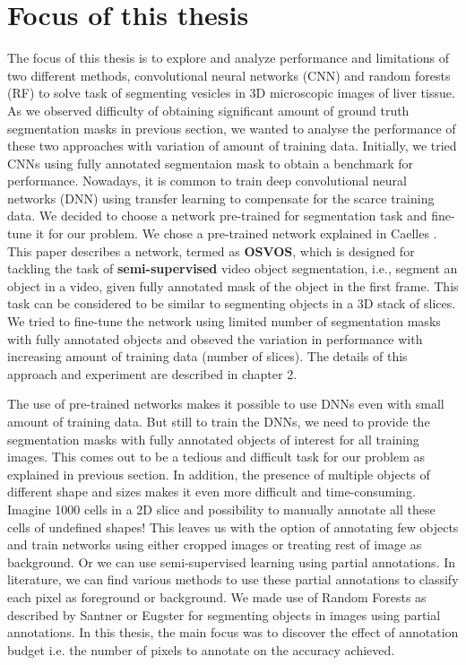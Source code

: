 \section{Focus of this thesis}
The focus of this thesis is to explore and analyze performance and limitations of two different methods, convolutional neural networks (CNN) and random forests (RF) to solve task of segmenting vesicles in 3D microscopic images of liver tissue. As we observed difficulty of obtaining significant amount of ground truth segmentation masks in previous section, we wanted to analyse the performance of these two approaches with variation of amount of training data. Initially, we tried CNNs using fully annotated segmentaion mask to obtain a benchmark for performance. Nowadays, it is common to train deep convolutional neural networks (DNN) using transfer learning to compensate for the scarce training data. We decided to choose a network pre-trained for segmentation task and fine-tune it for our problem. We chose a pre-trained network explained in Caelles \cite{osvos}. This paper describes a network, termed as \textbf{OSVOS}, which is designed for tackling the task of \textbf{semi-supervised} video object segmentation, i.e., segment an object in a video, given fully annotated mask of the object in the first frame. This task can be considered to be similar to segmenting objects in a 3D stack of slices. We tried to fine-tune the network using limited number of segmentation masks with fully annotated objects and obseved the variation in performance with increasing amount of training data (number of slices). The details of this approach and experiment are described in chapter 2.  \par
The use of pre-trained networks makes it possible to use DNNs even with small amount of training data. But still to train the DNNs, we need to provide the segmentation masks with fully annotated objects of interest for all training images. This comes out to be a tedious and difficult task for our problem as explained in previous section. In addition, the presence of multiple objects of different shape and sizes makes it even more difficult and time-consuming. Imagine 1000 cells in a 2D slice and possibility to manually annotate all these cells of undefined shapes! This leaves us with the option of annotating few objects and train networks using either cropped images or treating rest of image as background. Or we can use semi-supervised learning using partial annotations. In literature, we can find various methods to use these partial annotations to classify each pixel as foreground or background. We made use of Random Forests as described by Santner \cite{santner:2009} or Eugster \cite{dominic} for segmenting objects in images using partial annotations. In this thesis, the main focus was to discover the effect of annotation budget i.e. the number of pixels to annotate on the accuracy achieved. \par

